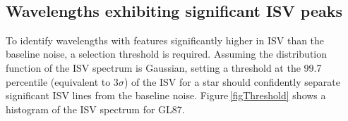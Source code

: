 \begin{figure}
    \centering
	\captionsetup{width=.8\textwidth}
    \\
    \caption{}
    \label{figGL514}
\end{figure}

\subsection{Wavelengths exhibiting significant ISV peaks}
\label{secISVlines}
To identify wavelengths with features significantly higher in ISV than the baseline noise, a selection threshold is required. Assuming the distribution function of the ISV spectrum is Gaussian, setting a threshold at the 99.7 percentile (equivalent to 3$\sigma$) of the ISV for a star should confidently separate significant ISV lines from the baseline noise. Figure\,\ref{figThreshold} shows a histogram of the ISV spectrum for GL87.\\


